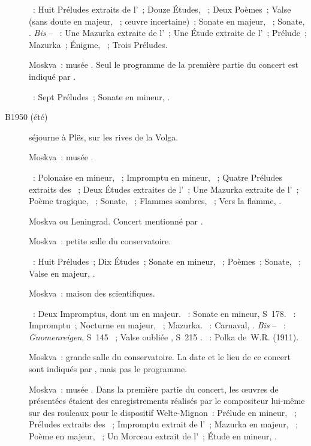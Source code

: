 \begin{description}
 \textsc{\Scriabine{}}~: Huit Préludes extraits de l'~; Douze
 Études, ~; Deux Poèmes~; Valse (sans doute en \kA \Flat majeur,
 ~; œuvre incertaine)~; Sonate en \kF \Sharp majeur, ~;
 Sonate, .
 \emph{Bis} -- \textsc{\Scriabine{}}~: Une Mazurka extraite de l'~;
 Une Étude extraite de l'~; Prélude~; Mazurka~; Énigme, 
 ~; Trois Préludes.
 \item[\DateWithWeekDay{1950-06-12}]
 Moskva~: musée \Scriabine{}.
 Seul le programme de la première partie du concert est indiqué par
 \citet[p.~432]{Scriabine}.

 \textsc{\Scriabine{}}~: Sept Préludes~; Sonate en \kF \Sharp mineur,
 .
 \item[B1950 (été)]
 \VSofronitsky{} séjourne à Plës, sur les rives de la Volga.
 \item[\DateWithWeekDay{1950-09-28}]
 Moskva~: musée \Scriabine{}.

 \textsc{\Scriabine{}}~: Polonaise en \kB \Flat mineur, ~;
 Impromptu en \kB \Flat mineur,  ~; Quatre Préludes
 extraits des ~; Deux Études extraites de l'~; Une
 Mazurka extraite de l'~; Poème tragique, ~; Sonate,
 ~; Flammes sombres,  ~; Vers la flamme,
 .
 \item[\DateWithWeekDay{1950-10-05}]
 Moskva ou Leningrad.
 Concert mentionné par \citet[p.~171]{Nekrasova08}.
 \item[\DateWithWeekDay{1950-10-19}]
 Moskva~: petite salle du conservatoire.

 \textsc{\Scriabine{}}~: Huit Préludes~; Dix Études~; Sonate en \kF \Sharp
 mineur, ~; Poèmes~; Sonate, ~; Valse en \kA \Flat majeur,
 .
 \item[\DateWithWeekDay{1950-10-29}]
 Moskva~: maison des scientifiques.

 \textsc{\Schubert{}}~: Deux Impromptus, dont un en \kA \Flat majeur.
 \textsc{\Liszt{}}~: Sonate en \kB mineur, S~178.
 \textsc{\Chopin{}}~: Impromptu~; Nocturne en \kF \Sharp majeur, 
 ~; Mazurka.
 \textsc{\Schumann{}}~: Carnaval, .
 \emph{Bis} -- \textsc{\Liszt{}}~: \emph{Gnomenreigen}, S~145 ~;
 Valse oubliée , S~215 .
 \textsc{\Rachmaninov{}}~: Polka de~W.R. (1911).
 \item[\DateWithWeekDay{1950-11-26}]
 Moskva~: grande salle du conservatoire.
 La date et le lieu de ce concert sont indiqués par \ASofronitsky{}, mais
 pas le programme.
 \item[\DateWithWeekDay{1950-12-05}]
 Moskva~: musée \Scriabine{}.
 Dans la première partie du concert, les œuvres de \Scriabine{} présentées
 étaient des enregistrements réalisés par le compositeur lui-même sur des
 rouleaux pour le dispositif Welte-Mignon~: Prélude en \kG \Sharp mineur,
  ~; Préludes extraits des ~; Impromptu
 extrait de l'~; Mazurka en \kF \Sharp majeur, 
 ~; Poème en \kF \Sharp majeur,  ~; Un Morceau
 extrait de l'~; Étude en \kD \Sharp mineur,  .


\end{description}
